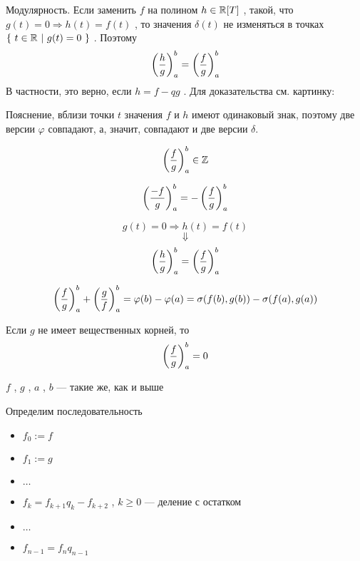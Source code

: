 \SSsect[!] Модулярность. Если заменить \( f \) на полином \( h \in \mathbb{R}[T] \) , такой, что
\( g(t) = 0 \Rightarrow h(t) = f(t) \) , то значения \( \delta(t) \) не изменяться в точках
\( \left\lbrace~  t\in \mathbb{R}  ~|~  g(t) = 0  ~\right\rbrace \) . Поэтому
\[ \left( \frac{h}{g} \right)^b_a = \left( \frac{f}{g} \right)^b_a \]
В частности, это верно, если \( h=f-qg \) . Для доказательства см. картинку:
\vspace
{}

Пояснение, вблизи точки \( t \) значения \( f\) и \( h \) имеют одинаковый знак, поэтому две версии \( \varphi \) совпадают, а, значит, совпадают и две версии \( \delta \).

\vspace

\SSresume

\SSsect 
\[ \left( \frac{f}{g} \right)^b_a \in \mathbb{Z} \]

\SSsect
\[ \left( \frac{-f}{g} \right)^b_a = - \left( \frac{f}{g} \right)^b_a \]

\SSsect
\[ g(t) = 0 \Rightarrow h(t) = f(t) \]
\[ \Downarrow \]
\[ \left( \frac{h}{g} \right)^b_a = \left( \frac{f}{g} \right)^b_a \]

\SSsect
\[ \left( \frac{f}{g} \right)^b_a + \left( \frac{g}{f} \right)^b_a = \varphi(b)-\varphi(a) = \sigma(f(b),g(b)) - \sigma(f(a),g(a)) \]

\SSsect Если \( g \) не имеет вещественных корней, то
\[ \left( \frac{f}{g} \right)^b_a = 0 \]

\SSbullet

\begin{center}
    \( f \) , \( g \) , \( a \) , \( b \) --- такие же, как и выше
\end{center}

\SSsect Определим последовательность
\begin{itemize}[label=]
\item \( f_0 := f \)
\item \( f_1 := g \)
\item \( \dots \)
\item \( f_k = f_{k+1} q_k - f_{k+2} \) , \( k \geqslant 0 \) --- деление с остатком
\item \( \dots \)
\item \( f_{n-1} = f_n q_{n-1}\)
\end{itemize}

